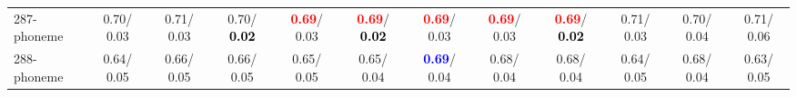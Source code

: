 \begin{table}[h]
\begin{center}
{\begin{tabular}{lc|c|c|c|c|c|c|c|c|c|c}
287-phoneme &   0.70/  0.03 &   0.71/  0.03 &   0.70/\textcolor{black}{\textbf{  0.02}} & \textcolor{red}{\textbf{  0.69}}/  0.03 & \textcolor{red}{\textbf{  0.69}}/\textcolor{black}{\textbf{  0.02}} & \textcolor{red}{\textbf{  0.69}}/  0.03 & \textcolor{red}{\textbf{  0.69}}/  0.03 & \textcolor{red}{\textbf{  0.69}}/\textcolor{black}{\textbf{  0.02}} &   0.71/  0.03 &   0.70/  0.04 &   0.71/  0.06 \\
288-phoneme &   0.64/  0.05 &   0.66/  0.05 &   0.66/  0.05 &   0.65/  0.05 &   0.65/  0.04 & \textcolor{blue}{\textbf{  0.69}}/  0.04 &   0.68/  0.04 &   0.68/  0.04 &   0.64/  0.05 &   0.68/  0.04 &   0.63/  0.05 \\\end{tabular}}\label{stratsALCKappa8Allalla}
\end{center}
\end{table}
